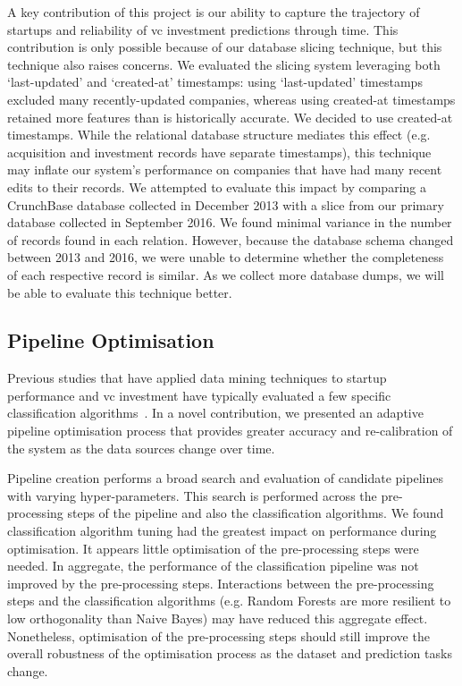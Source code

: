 \documentclass[../thesis/thesis.tex]{subfiles}
\begin{document}
A key contribution of this project is our ability to capture the trajectory of startups and reliability of \gls{vc} investment predictions through time. This contribution is only possible because of our database slicing technique, but this technique also raises concerns. We evaluated the slicing system leveraging both `last-updated' and `created-at' timestamps: using `last-updated' timestamps excluded many recently-updated companies, whereas using created-at timestamps retained more features than is historically accurate. We decided to use created-at timestamps. While the relational database structure mediates this effect (e.g. acquisition and investment records have separate timestamps), this technique may inflate our system's performance on companies that have had many recent edits to their records. We attempted to evaluate this impact by comparing a CrunchBase database collected in December 2013 with a slice from our primary database collected in September 2016. We found minimal variance in the number of records found in each relation. However, because the database schema changed between 2013 and 2016, we were unable to determine whether the completeness of each respective record is similar. As we collect more database dumps, we will be able to evaluate this technique better.

\subsection{Pipeline Optimisation}

Previous studies that have applied data mining techniques to startup performance and \gls{vc} investment have typically evaluated a few specific classification algorithms~\cite{beckwith2016, bhat2011,ahn2008,liang2016}. In a novel contribution, we presented an adaptive pipeline optimisation process that provides greater accuracy and re-calibration of the system as the data sources change over time.

Pipeline creation performs a broad search and evaluation of candidate pipelines with varying hyper-parameters. This search is performed across the pre-processing steps of the pipeline and also the classification algorithms. We found classification algorithm tuning had the greatest impact on performance during optimisation. It appears little optimisation of the pre-processing steps were needed. In aggregate, the performance of the classification pipeline was not improved by the pre-processing steps. Interactions between the pre-processing steps and the classification algorithms (e.g. Random Forests are more resilient to low orthogonality than Naive Bayes) may have reduced this aggregate effect. Nonetheless, optimisation of the pre-processing steps should still improve the overall robustness of the optimisation process as the dataset and prediction tasks change.
\end{document}
